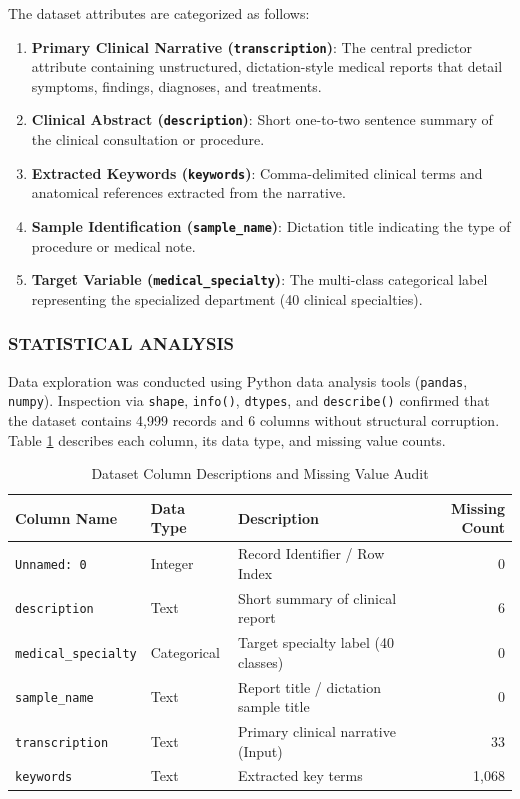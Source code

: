 The dataset attributes are categorized as follows:
\begin{enumerate}
    \item \textbf{Primary Clinical Narrative (\texttt{transcription})}: The central predictor attribute containing unstructured, dictation-style medical reports that detail symptoms, findings, diagnoses, and treatments.
    \item \textbf{Clinical Abstract (\texttt{description})}: Short one-to-two sentence summary of the clinical consultation or procedure.
    \item \textbf{Extracted Keywords (\texttt{keywords})}: Comma-delimited clinical terms and anatomical references extracted from the narrative.
    \item \textbf{Sample Identification (\texttt{sample\_name})}: Dictation title indicating the type of procedure or medical note.
    \item \textbf{Target Variable (\texttt{medical\_specialty})}: The multi-class categorical label representing the specialized department (40 clinical specialties).
\end{enumerate}

\subsubsection{STATISTICAL ANALYSIS}
Data exploration was conducted using Python data analysis tools (\texttt{pandas}, \texttt{numpy}). Inspection via \texttt{shape}, \texttt{info()}, \texttt{dtypes}, and \texttt{describe()} confirmed that the dataset contains 4,999 records and 6 columns without structural corruption. Table \ref{tab:column_description} describes each column, its data type, and missing value counts.

\begin{table}[H]
\centering
\small
\setlength{\tabcolsep}{5pt}
\begin{tabularx}{\linewidth}{|>{\raggedright\arraybackslash}p{3.0cm}|>{\raggedright\arraybackslash}p{2.0cm}|>{\raggedright\arraybackslash}X|r|}
\hline
\textbf{Column Name} & \textbf{Data Type} & \textbf{Description} & \textbf{Missing Count} \\
\hline
\texttt{Unnamed: 0} & Integer & Record Identifier / Row Index & 0 \\
\hline
\texttt{description} & Text & Short summary of clinical report & 6 \\
\hline
\texttt{medical\_specialty} & Categorical & Target specialty label (40 classes) & 0 \\
\hline
\texttt{sample\_name} & Text & Report title / dictation sample title & 0 \\
\hline
\texttt{transcription} & Text & Primary clinical narrative (Input) & 33 \\
\hline
\texttt{keywords} & Text & Extracted key terms & 1,068 \\
\hline
\end{tabularx}
\caption{Dataset Column Descriptions and Missing Value Audit}
\label{tab:column_description}
\end{table}

